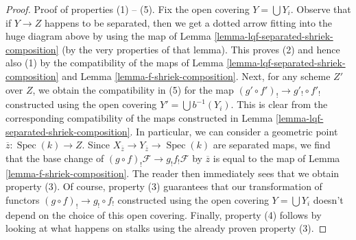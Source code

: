 \documentclass{stacks-project}
\theoremstyle{plain}
\theoremstyle{definition}
\theoremstyle{remark}
\numberwithin{equation}{subsection}
\def\Spec{\mathop{\mathrm{Spec}}}
\begin{document}
\begin{proof}
\medskip\noindent
Proof of properties (1) -- (5). Fix the open covering $Y = \bigcup Y_i$.
Observe that if $Y \to Z$ happens to be separated, then we get a dotted
arrow fitting into the huge diagram above by using the map of
Lemma \ref{lemma-lqf-separated-shriek-composition}
(by the very properties of that lemma).
This proves (2) and hence also (1) by the compatibility of the
maps of Lemma \ref{lemma-lqf-separated-shriek-composition}
and Lemma \ref{lemma-f-shriek-composition}.
Next, for any scheme $Z'$ over $Z$, we obtain the compatibility in (5)
for the map $(g' \circ f')_! \to g'_! \circ f'_!$
constructed using the open covering $Y' = \bigcup b^{-1}(Y_i)$.
This is clear from the corresponding compatibility of the maps
constructed in Lemma \ref{lemma-lqf-separated-shriek-composition}.
In particular, we can consider a geometric point
$\overline{z} : \Spec(k) \to Z$. Since
$X_{\overline{z}} \to Y_{\overline{z}} \to \Spec(k)$
are separated maps, we find that the base change of
$(g \circ f)_!\mathcal{F} \to g_! f_! \mathcal{F}$
by $\overline{z}$ is equal to the map of
Lemma \ref{lemma-f-shriek-composition}.
The reader then immediately sees that we obtain property (3).
Of course, property (3) guarantees that our transformation of functors
$(g \circ f)_! \to g_! \circ f_!$ constructed using the open covering
$Y = \bigcup Y_i$ doesn't depend on the choice of this open covering.
Finally, property (4) follows by looking at what happens on stalks
using the already proven property (3).
\end{proof}
\end{document}

